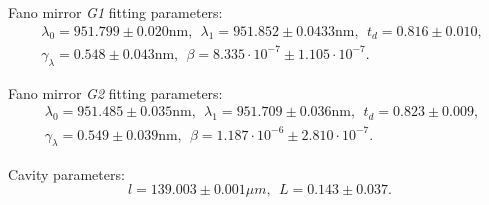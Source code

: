 Fano mirror \emph{G1} fitting parameters:
\begin{equation}
    \begin{split}
        &\lambda_0 = 951.799 \pm 0.020 \text{nm}, \:\: \lambda_1 = 951.852 \pm 0.0433 \text{nm}, \:\: t_d = 0.816 \pm 0.010, \:\: \\&\gamma_{\lambda} = 0.548 \pm 0.043 \text{nm}, \:\: \beta = 8.335 \cdot 10^{-7} \pm 1.105 \cdot 10^{-7}.
    \end{split}
\end{equation}

Fano mirror \emph{G2} fitting parameters:
\begin{equation}
    \begin{split}
        &\lambda_0 = 951.485 \pm 0.035 \text{nm}, \:\: \lambda_1 = 951.709 \pm 0.036 \text{nm}, \:\: t_d = 0.823 \pm 0.009, \:\: \\&\gamma_{\lambda} = 0.549 \pm 0.039 \text{nm}, \:\: \beta = 1.187 \cdot 10^{-6} \pm 2.810 \cdot 10^{-7}.
    \end{split}
\end{equation}

Cavity parameters:
\begin{equation}
    l = 139.003 \pm 0.001 \mu m, \:\: L = 0.143 \pm 0.037.
\end{equation}

